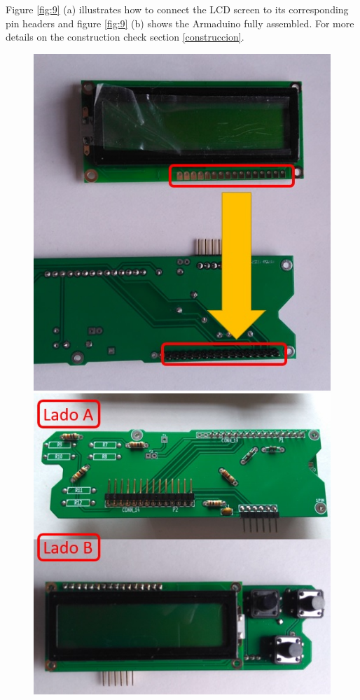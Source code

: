\documentclass[12pt,letterpaper]{article}
\numberwithin{figure}{section}
\numberwithin{equation}{section}
\numberwithin{table}{section}
\begin{document}
Figure \ref{fig:9} (a) illustrates how to connect the LCD screen to its corresponding pin headers and figure \ref{fig:9} (b) shows the Armaduino fully assembled. For more details on the construction check section \ref{construccion}.

\begin{figure}[H]
    \centering
    \begin{minipage}{.5\textwidth}
    \centering
    \includegraphics[width=\linewidth]{Figuras/figure_9_b.jpg}
    \end{minipage}%
    \begin{minipage}{0.5\textwidth}
    \centering
    \includegraphics[width=\linewidth]{Figuras/figure_9_a.jpg}   

\end{minipage}
\end{figure}
\end{document}

